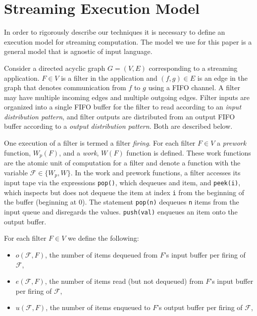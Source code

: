 \section{Streaming Execution Model}

In order to rigorously describe our techniques it is necessary to
define an execution model for streaming computation. The model we use
for this paper is a general model that is agnostic of input language.

Consider a directed acyclic graph $G = (V, E)$ corresponding to a
streaming application. $F \in V$ is a filter in the application and
$(f, g) \in E$ is an edge in the graph that denotes communication from
$f$ to $g$ using a FIFO channel.  A filter may have multiple incoming
edges and multiple outgoing edges.  Filter inputs are organized into a
single FIFO buffer for the filter to read according to an {\it input
distribution pattern}, and filter outputs are distributed from an
output FIFO buffer according to a {\it output distribution pattern}.  Both
are described below.

One execution of a filter is termed a filter {\it firing}. For each
filter $F \in V$ a {\it prework} function, $W_p(F)$, and a {\it work},
$W(F)$ function is defined.  These work functions are the atomic unit
of computation for a filter and denote a function with the variable
$\mathcal{F} \in \{W_p, W\}$.  In the work and prework functions, a
filter accesses its input tape via the expressions {\tt pop()}, which
dequeues and item, and {\tt peek(i)}, which inspects but does not
dequeue the item at index {\tt i} from the beginning of the buffer
(beginning at 0).  The statement {\tt pop(n)} dequeues {\tt n} items
from the input queue and disregards the values.  {\tt push(val)}
enqueues an item onto the output buffer.

For each filter $F \in V$ we define the following:
\begin{itemize}

\item $o(\mathcal{F}, F)$, the number of items dequeued from $F$'s
input buffer per firing of $\mathcal{F}$,

\item $e(\mathcal{F}, F)$, the number of items read (but not dequeued)
from $F$'s input buffer per firing of $\mathcal{F}$,

\item $u(\mathcal{F}, F)$, the number of items enqueued to $F$'s
output buffer per firing of $\mathcal{F}$,

\end{itemize}

